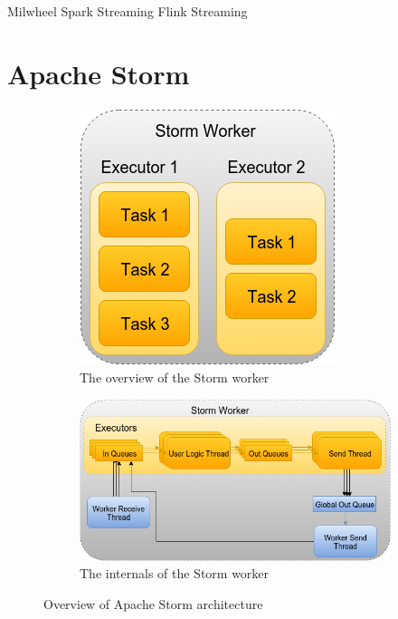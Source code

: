 \documentclass[conference]{IEEEtran}
\begin{document}
\lipsum[2-6]

Milwheel
Spark Streaming
Flink Streaming

\cite{InfoQGameChanger}

\section{Apache Storm}
\label{sec:ApacheStorm}

\begin{figure}[!h]
\centering
	\begin{subfigure}{.55\columnwidth}
		\includegraphics[scale=0.45]{figures/StormWorker}
		    \caption{The overview of the Storm worker}
		    \label{fig:StormWorkerOverview}
	\end{subfigure}\hspace{2.9em}
	\begin{subfigure}{1.35\columnwidth}
		\includegraphics[scale=0.45]{figures/StormWorkerDetail}
		    \caption{The internals of the Storm worker}
		    \label{fig:StormWorkerDetail}
	\end{subfigure}\hfill
\label{StormOverview}
\caption{Overview of Apache Storm architecture}
\end{figure}
\end{document}
